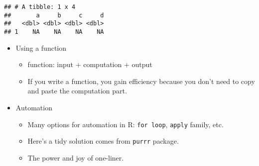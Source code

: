 \documentclass[
]{book}
\newenvironment{Shaded}{\begin{snugshade}}{\end{snugshade}}
\newcommand{\CommentTok}[1]{\textcolor[rgb]{0.56,0.35,0.01}{\textit{#1}}}
\newcommand{\ControlFlowTok}[1]{\textcolor[rgb]{0.13,0.29,0.53}{\textbf{#1}}}
\newcommand{\DecValTok}[1]{\textcolor[rgb]{0.00,0.00,0.81}{#1}}
\newcommand{\KeywordTok}[1]{\textcolor[rgb]{0.13,0.29,0.53}{\textbf{#1}}}
\newcommand{\NormalTok}[1]{#1}
\newcommand{\OperatorTok}[1]{\textcolor[rgb]{0.81,0.36,0.00}{\textbf{#1}}}
\newcommand{\OtherTok}[1]{\textcolor[rgb]{0.56,0.35,0.01}{#1}}
\newcommand{\StringTok}[1]{\textcolor[rgb]{0.31,0.60,0.02}{#1}}
\providecommand{\tightlist}{%
  \setlength{\itemsep}{0pt}\setlength{\parskip}{0pt}}
\begin{document}
\begin{verbatim}
## # A tibble: 1 x 4
##       a     b     c     d
##   <dbl> <dbl> <dbl> <dbl>
## 1    NA    NA    NA    NA
\end{verbatim}

\begin{itemize}
\tightlist
\item
  Using a function

  \begin{itemize}
  \tightlist
  \item
    function: input + computation + output
  \item
    If you write a function, you gain efficiency because you don't need to copy and paste the computation part.
  \end{itemize}
\end{itemize}

\begin{Shaded}
\end{Shaded}

\begin{itemize}
\tightlist
\item
  Automation

  \begin{itemize}
  \tightlist
  \item
    Many options for automation in R: \texttt{for\ loop}, \texttt{apply} family, etc.
  \item
    Here's a tidy solution comes from \texttt{purrr} package.
  \item
    The power and joy of one-liner.
  \end{itemize}
\end{itemize}
\end{document}
